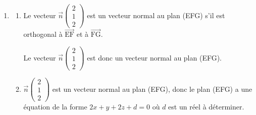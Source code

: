 \documentclass[10pt]{article}
\providecommand{\vect}[1]{\overrightarrow{#1}}
\providecommand{\vectt}[1]{\overrightarrow{\mathrm{#1}}}
\providecommand{\ds}{\displaystyle}
\begin{document}
\begin{enumerate}
\begin{enumerate}
$\mathcal{A}=\dfrac{\text{EH}\times \text{FG}}{2}$.		


Donc l'aire du triangle est en cm$^2$: 
$\mathcal{A}= \dfrac{3\sqrt{2}\times 4\sqrt{2}}{2}=12$.

	\end{enumerate}
\item
	\begin{enumerate}
		\item Le vecteur $\vec{n}\begin{pmatrix}2 \\ 1 \\ 2\end{pmatrix}$ est un vecteur normal au plan (EFG) s'il est orthogonal à $\vectt{EF}$ et à $\vectt{FG}$.
		

Le vecteur $\vec{n}\begin{pmatrix}2 \\ 1 \\ 2\end{pmatrix}$ est donc un vecteur normal au plan (EFG).
		\item
$\vec{n}\begin{pmatrix}2 \\ 1 \\ 2\end{pmatrix}$ est  un vecteur normal au plan (EFG), donc le plan (EFG) a une équation de la forme $2x+y+2z+d=0$ où $d$ est un réel à déterminer.


\end{enumerate}
\end{enumerate}
\end{document}
